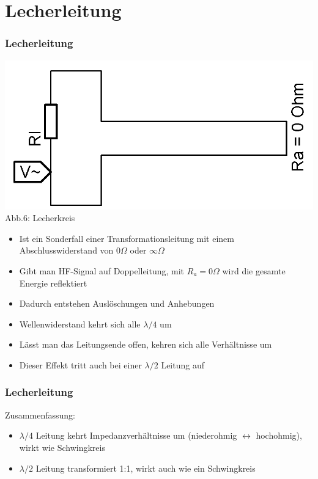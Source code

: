 \section*{Lecherleitung}
\begin{frame}
  \frametitle{Lecherleitung}
  \begin{center}
    \includegraphics[width=\textwidth,height=.3\textheight,keepaspectratio]{a10/Lecherkreis.png}\\
    {\tiny Abb.6: Lecherkreis}
  \end{center}
  \begin{itemize}
    \item Ist ein Sonderfall einer Transformationsleitung mit einem Abschlusswiderstand von $0 \Omega$ oder $\infty \Omega$
    \item Gibt man HF-Signal auf Doppelleitung, mit $R_a = 0 \Omega$ wird die gesamte Energie reflektiert
    \item Dadurch entstehen Auslöschungen und Anhebungen
    \item Wellenwiderstand kehrt sich alle $\lambda /4$ um
    \item Lässt man das Leitungsende offen, kehren sich alle Verhältnisse um
    \item Dieser Effekt tritt auch bei einer $\lambda /2$ Leitung auf
  \end{itemize}
\end{frame}

\begin{frame}
  \frametitle{Lecherleitung}

  Zusammenfassung:

  \begin{itemize}
    \item $\lambda /4$ Leitung kehrt Impedanzverhältnisse um (niederohmig $\leftrightarrow$ hochohmig), wirkt wie Schwingkreis
    \item $\lambda /2$ Leitung transformiert 1:1, wirkt auch wie ein Schwingkreis
  \end{itemize}

\end{frame}

